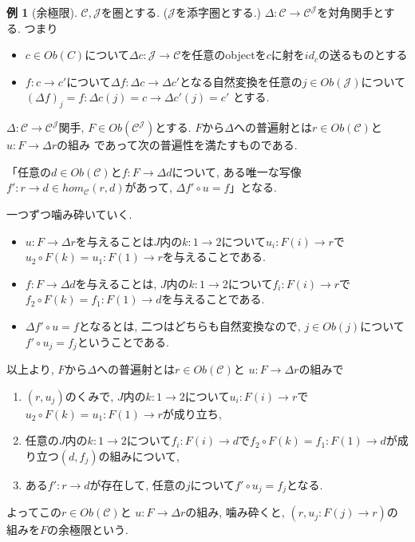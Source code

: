 \documentclass[dvipdfmx,a4paper,11pt]{report}
\theoremstyle{definition}
\newtheorem{exa}[thm]{例}
\begin{document}
\begin{exa}[余極限]
$\mathcal{C}, \mathcal{J}$を圏とする. ($\mathcal{J}$を添字圏とする.)
$\Delta : \mathcal{C} \to \mathcal{C}^{\mathcal{J}}$を対角関手とする.
つまり
\begin{itemize}
\item$c \in Ob(C)$について$\Delta c : \mathcal{J} \to \mathcal{C}$を任意のobjectを$c$に射を$id_c$の送るものとする
\item  $f: c \to c'$について$\Delta f : \Delta c \to \Delta c'$となる自然変換を任意の$j \in Ob(\mathcal{J})$について$(\Delta f)_{j}=f : \Delta c(j) = c \to \Delta c' (j)=c' $ とする.
\end{itemize}

$\Delta : \mathcal{C} \to \mathcal{C}^{\mathcal{J}}$関手, 
$F \in Ob(\mathcal{C}^{\mathcal{J}})$とする.
$F$から$\Delta $への普遍射とは$r \in Ob(\mathcal{C})$と $u: F \to \Delta r$の組み
であって次の普遍性を満たすものである.

「任意の$d \in Ob(\mathcal{C})$と$f : F\to \Delta d$について, ある唯一な写像$f' : r \to d \in hom_{\mathcal{C}}(r,d)$があって, $\Delta f' \circ u =f$」となる.

一つずつ噛み砕いていく.
\begin{itemize}
\item $u: F \to \Delta r$を与えることは$J$内の$k : 1\to 2$について$u_i : F(i) \to r$で$u_2 \circ F(k) = u_1 : F(1) \to r$を与えることである.
\item $f : F\to \Delta d$を与えることは, $J$内の$k : 1\to 2$について$f_i : F(i) \to r$で$f_2 \circ F(k) = f_1 : F(1) \to d$を与えることである.
\item  $\Delta f' \circ u =f$となるとは, 二つはどちらも自然変換なので, $j \in Ob(j)$について$f' \circ u_j = f_j$ということである.
\end{itemize}
以上より, $F$から$\Delta $への普遍射とは$r \in Ob(\mathcal{C})$と $u: F \to \Delta r$の組みで
\begin{enumerate}
\item $(r, u_j)$のくみで, $J$内の$k : 1\to 2$について$u_i : F(i) \to r$で$u_2 \circ F(k) = u_1 : F(1) \to r$が成り立ち, 
\item 任意の$J$内の$k : 1\to 2$について$f_i : F(i) \to d$で$f_2 \circ F(k) = f_1 : F(1) \to d$が成り立つ$(d, f_j)$の組みについて,
\item ある$f' : r \to d$が存在して, 任意の$j$について$f' \circ u_j = f_j$となる.
\end{enumerate}
よってこの$r \in Ob(\mathcal{C})$と $u: F \to \Delta r$の組み, 噛み砕くと,
$(r, u_j : F(j) \to r)$の組みを$F$の余極限という. 
\end{exa}
\end{document}
